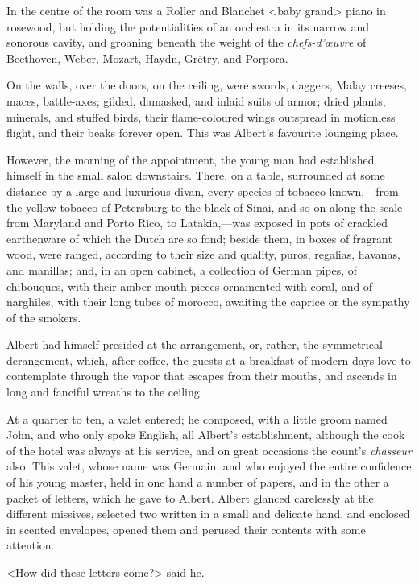  In the centre of the room was a Roller and Blanchet <baby grand> piano in rosewood, but holding the potentialities of an orchestra in its narrow and sonorous cavity, and groaning beneath the weight of the \textit{chefs-d'œuvre} of Beethoven, Weber, Mozart, Haydn, Grétry, and Porpora. 

 On the walls, over the doors, on the ceiling, were swords, daggers, Malay creeses, maces, battle-axes; gilded, damasked, and inlaid suits of armor; dried plants, minerals, and stuffed birds, their flame-coloured wings outspread in motionless flight, and their beaks forever open. This was Albert's favourite lounging place. 

 However, the morning of the appointment, the young man had established himself in the small salon downstairs. There, on a table, surrounded at some distance by a large and luxurious divan, every species of tobacco known,—from the yellow tobacco of Petersburg to the black of Sinai, and so on along the scale from Maryland and Porto Rico, to Latakia,—was exposed in pots of crackled earthenware of which the Dutch are so fond; beside them, in boxes of fragrant wood, were ranged, according to their size and quality, puros, regalias, havanas, and manillas; and, in an open cabinet, a collection of German pipes, of chibouques, with their amber mouth-pieces ornamented with coral, and of narghiles, with their long tubes of morocco, awaiting the caprice or the sympathy of the smokers. 

 Albert had himself presided at the arrangement, or, rather, the symmetrical derangement, which, after coffee, the guests at a breakfast of modern days love to contemplate through the vapor that escapes from their mouths, and ascends in long and fanciful wreaths to the ceiling. 

 At a quarter to ten, a valet entered; he composed, with a little groom named John, and who only spoke English, all Albert's establishment, although the cook of the hotel was always at his service, and on great occasions the count's \textit{chasseur} also. This valet, whose name was Germain, and who enjoyed the entire confidence of his young master, held in one hand a number of papers, and in the other a packet of letters, which he gave to Albert. Albert glanced carelessly at the different missives, selected two written in a small and delicate hand, and enclosed in scented envelopes, opened them and perused their contents with some attention. 

 <How did these letters come?> said he. 


